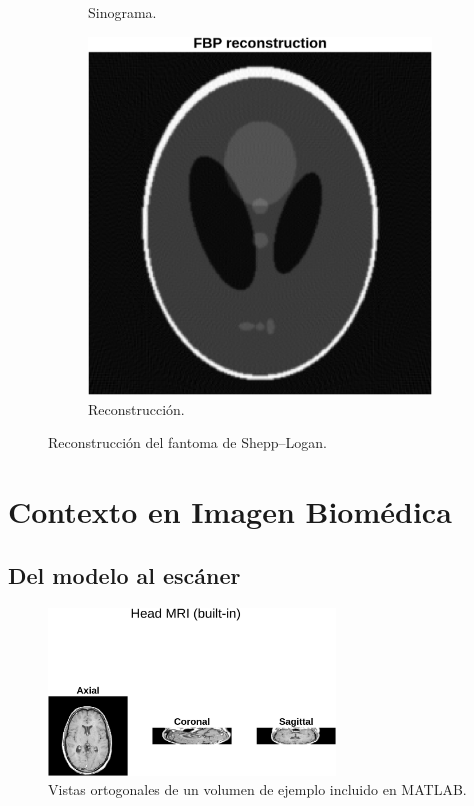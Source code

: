 \documentclass[11pt]{article}
\begin{document}
\begin{figure}[H]
\begin{subfigure}[b]{0.34\textwidth}
  \caption{Sinograma.}
\end{subfigure}\hfill
\begin{subfigure}[b]{0.30\textwidth}
  \includegraphics[width=\linewidth]{figures/phantom_reconstruction.png}
  \caption{Reconstrucción.}
\end{subfigure}
\caption{Reconstrucción del fantoma de Shepp–Logan.}
\label{fig:phantom}
\end{figure}
\FloatBarrier

\section{Contexto en Imagen Biomédica}

\subsection{Del modelo al escáner}

\begin{figure}[H]
\centering
\includegraphics[width=0.68\textwidth]{figures/mri_volume.png}
\caption{Vistas ortogonales de un volumen de ejemplo incluido en MATLAB.}
\label{fig:mri}
\end{figure}
\FloatBarrier
\end{document}

